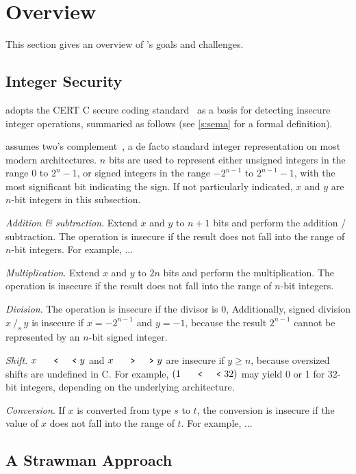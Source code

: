 \section{Overview}
\label{s:oview}

This section gives an overview of \sys's goals and challenges.

\subsection{Integer Security}

\sys adopts the CERT C secure coding
standard~\cite[Ch.~5]{seacord:secure-c} as a basis for detecting
insecure integer operations, summaried as follows (see \autoref{s:sema}
for a formal definition).

\sys assumes two's complement~\cite[Ch.~4.2.1]{intel:vol1}, a de
facto standard integer representation on most modern architectures.
$n$ bits are used to represent either unsigned integers in the range
$0$ to $2^n-1$, or signed integers in the range $-2^{n-1}$ to
$2^{n-1}-1$, with the most significant bit indicating the sign.  If
not particularly indicated, $x$ and $y$ are $n$-bit integers in
this subsection.

\noindent
{\it Addition \& subtraction}.
Extend $x$ and $y$ to $n+1$ bits and perform the addition / subtraction.
The operation is insecure if the result does not fall into the range of
$n$-bit integers.  For example, ...

\noindent
{\it Multiplication}.
Extend $x$ and $y$ to $2n$ bits and perform the multiplication.
The operation is insecure if the result does not fall
into the range of $n$-bit integers.

\noindent
{\it Division}.
The operation is insecure if the divisor is 0, Additionally, signed
division $x\ /_s\ y$ is insecure if $x = -2^{n-1}$ and $y = -1$,
because the result $2^{n-1}$ cannot be represented by an $n$-bit
signed integer.

\noindent
{\it Shift}. $x \shl y$ and $x \shr y$ are insecure if $y \geq n$,
because oversized shifts are undefined in C.  For example, $(1 \shl
32)$ may yield 0 or 1 for 32-bit integers, depending on the underlying
architecture.

\noindent
{\it Conversion}.
If $x$ is converted from type $s$ to $t$, the conversion is insecure
if the value of $x$ does not fall into the range of $t$.  For example,
...

\subsection{A Strawman Approach}

